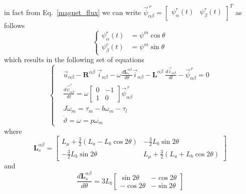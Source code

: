 \documentclass[11pt,a4paper]{article}
\numberwithin{equation}{section}
\theoremstyle{it}
\theoremstyle{definition}
\begin{document}
\begin{onehalfspace}
in fact from Eq.~\eqref{magnet_flux} we can write $\vec{\psi}^{\,r}_{\alpha\beta}=\begin{bmatrix} {\psi}^r_{\alpha}(t) &  {\psi}^r_{\beta}(t) \end{bmatrix}^T$ as follows
\begin{equation}\label{magnet_flux_ab}
	\left\lbrace \begin{aligned}
		\psi_\alpha^r(t) &= \psi^m\cos\theta \\[6pt]
		\psi_\beta^r(t) &= \psi^m\sin\theta
	\end{aligned} \right. 
\end{equation}
which results in the following set of equations
\begin{equation}\label{twophase_eq1}
	\left\lbrace \begin{aligned}
		& \vec{u}_{\alpha\beta}-\mathbf{R}^{\alpha\beta}\ \vec{i}_{\alpha\beta}-\omega\frac{d\mathbf{L}_s^{\alpha\beta}}{d\theta}\vec{i}_{\alpha\beta}-\mathbf{L}^{\alpha\beta}\ \frac{d\vec{i}_{\alpha\beta}}{dt}-\vec{\psi}^{\,r}_{\alpha\beta} = 0 \\[6pt]
		& \frac{d\vec{\psi}^{\,r}_{\alpha\beta}}{dt} = \omega \begin{bmatrix} 0 & -1 \\ 1 & 0\end{bmatrix} \vec{\psi}^{\,r}_{\alpha\beta} \\[6pt]
		& J\dot{\omega}_m = \tau_m-b{\omega}_m-\tau_l \\[6pt]
		& \dot{\vartheta} = \omega =p\omega_m
	\end{aligned} \right. 
\end{equation}
where
\begin{equation}\label{Lab}
	\mathbf{L}_s^{\alpha\beta} = 
	\begin{bmatrix} 
		L_{\mu}+\frac{3}{2}(L_a-L_b\cos2\theta) & -\frac{3}{2}L_b\sin2\theta \\[6pt]
		-\frac{3}{2}L_b\sin2\theta & L_{\mu}+\frac{3}{2}(L_a+L_b\cos2\theta)
	\end{bmatrix}
\end{equation}
and
\begin{equation}
	\frac{d\mathbf{L}_s^{\alpha\beta}}{d\theta} = 3L_b
	\begin{bmatrix} 
		\sin 2\theta & -\cos 2\theta \\[6pt]
		-\cos 2\theta & -\sin 2\theta
	\end{bmatrix}
\end{equation}


\end{onehalfspace}
\end{document}
